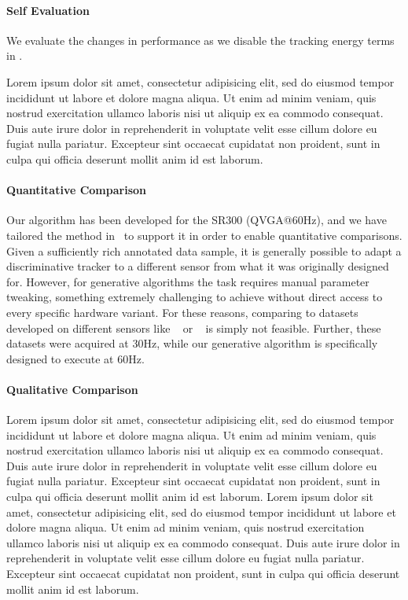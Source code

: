 \paragraph{Self Evaluation}
We evaluate the changes in performance as we disable the tracking energy terms in .

\begin{DRAFT}
Lorem ipsum dolor sit amet, consectetur adipisicing elit, sed do eiusmod tempor incididunt ut labore et dolore magna aliqua. Ut enim ad minim veniam, quis nostrud exercitation ullamco laboris nisi ut aliquip ex ea commodo consequat. Duis aute irure dolor in reprehenderit in voluptate velit esse cillum dolore eu fugiat nulla pariatur. Excepteur sint occaecat cupidatat non proident, sunt in culpa qui officia deserunt mollit anim id est laborum.
\end{DRAFT}

\paragraph{Quantitative Comparison}
Our algorithm has been developed for the \realsense{} SR300 (QVGA@60Hz), and we have tailored the method in~\cite{tagliasacchi2015robust} to support it in order to enable quantitative comparisons.
% 
Given a sufficiently rich annotated data sample, it is generally possible to adapt a discriminative tracker to a different sensor from what it was originally designed for. However, for generative algorithms the task requires manual parameter tweaking, something extremely challenging to achieve without direct access to every specific hardware variant.
% 
For these reasons, comparing to datasets developed on different sensors like \dexter{}~\cite{sridhar2013multicam} or \fingerpaint{}~\cite{sharp2015accurate} is simply not feasible. Further, these datasets were acquired at 30Hz, while our generative algorithm is specifically designed to execute at 60Hz.


\paragraph{Qualitative Comparison}
\begin{DRAFT}
Lorem ipsum dolor sit amet, consectetur adipisicing elit, sed do eiusmod tempor incididunt ut labore et dolore magna aliqua. Ut enim ad minim veniam, quis nostrud exercitation ullamco laboris nisi ut aliquip ex ea commodo consequat. Duis aute irure dolor in reprehenderit in voluptate velit esse cillum dolore eu fugiat nulla pariatur. Excepteur sint occaecat cupidatat non proident, sunt in culpa qui officia deserunt mollit anim id est laborum. Lorem ipsum dolor sit amet, consectetur adipisicing elit, sed do eiusmod tempor incididunt ut labore et dolore magna aliqua. Ut enim ad minim veniam, quis nostrud exercitation ullamco laboris nisi ut aliquip ex ea commodo consequat. Duis aute irure dolor in reprehenderit in voluptate velit esse cillum dolore eu fugiat nulla pariatur. Excepteur sint occaecat cupidatat non proident, sunt in culpa qui officia deserunt mollit anim id est laborum.
\end{DRAFT}

